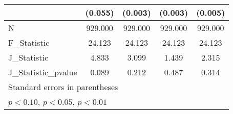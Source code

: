 {\begin{tabular}{l*{4}{c}}
            &     (0.055)         &     (0.003)         &     (0.003)         &     (0.005)         \\
\hline
N           &     929.000         &     929.000         &     929.000         &     929.000         \\
F\_Statistic &      24.123         &      24.123         &      24.123         &      24.123         \\
J\_Statistic &       4.833         &       3.099         &       1.439         &       2.315         \\
J\_Statistic\_pvalue&       0.089         &       0.212         &       0.487         &       0.314         \\
\hline\hline
\multicolumn{5}{l}{\footnotesize Standard errors in parentheses}\\
\multicolumn{5}{l}{\footnotesize \sym{*} \(p<0.10\), \sym{**} \(p<0.05\), \sym{***} \(p<0.01\)}\\
\end{tabular}
}
